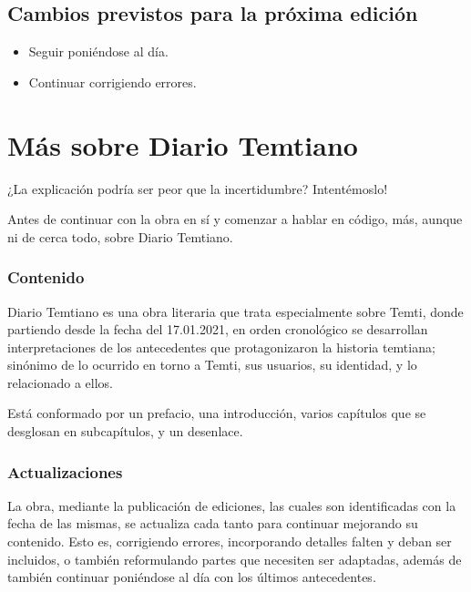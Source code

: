 \documentclass[
  spanish,
]{book}
\begin{document}
\hypertarget{cambios-previstos-para-la-pruxf3xima-ediciuxf3n}{%
\section*{Cambios previstos para la próxima edición}\label{cambios-previstos-para-la-pruxf3xima-ediciuxf3n}}

\begin{itemize}
\item
  Seguir poniéndose al día.
\item
  Continuar corrigiendo errores.
\end{itemize}

\hypertarget{muxe1s-sobre-diario-temtiano}{%
\chapter*{Más sobre Diario Temtiano}\label{muxe1s-sobre-diario-temtiano}}

¿La explicación podría ser peor que la incertidumbre? Intentémoslo!

Antes de continuar con la obra en sí y comenzar a hablar en código, más, aunque ni de cerca todo, sobre Diario Temtiano.

\hypertarget{contenido}{%
\subsection*{Contenido}\label{contenido}}

Diario Temtiano es una obra literaria que trata especialmente sobre Temti, donde partiendo desde la fecha del 17.01.2021, en orden cronológico se desarrollan interpretaciones de los antecedentes que protagonizaron la historia temtiana; sinónimo de lo ocurrido en torno a Temti, sus usuarios, su identidad, y lo relacionado a ellos.

Está conformado por un prefacio, una introducción, varios capítulos que se desglosan en subcapítulos, y un desenlace.

\hypertarget{actualizaciones}{%
\subsection*{Actualizaciones}\label{actualizaciones}}

La obra, mediante la publicación de ediciones, las cuales son identificadas con la fecha de las mismas, se actualiza cada tanto para continuar mejorando su contenido. Esto es, corrigiendo errores, incorporando detalles falten y deban ser incluidos, o también reformulando partes que necesiten ser adaptadas, además de también continuar poniéndose al día con los últimos antecedentes.
\end{document}
